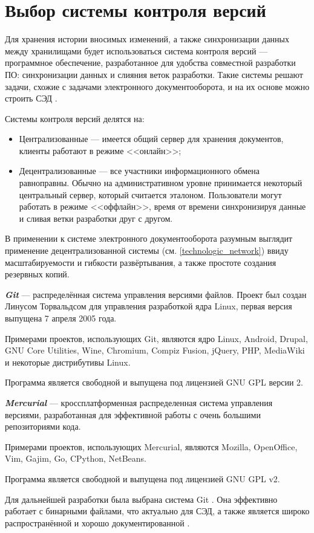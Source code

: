 \section{Выбор системы контроля версий} \label{technologic_cvs}

Для хранения истории вносимых изменений, а также синхронизации данных между хранилищами будет использоваться система контроля версий --- программное обеспечение, разработанное для удобства совместной разработки ПО: синхронизации данных и слияния веток разработки. Такие системы решают задачи, схожие с задачами  электронного документооборота, и на их основе можно строить СЭД \cite{my_conference_2013}.

\vspace{\baselineskip}
Системы контроля версий делятся на:
\begin{itemize}
		\item Централизованные --- имеется общий сервер для хранения документов, клиенты работают в режиме <<онлайн>>;
		\item Децентрализованные --- все участники информационного обмена равноправны. Обычно на административном уровне принимается некоторый центральный сервер, который считается эталоном. Пользователи могут работать в режиме <<оффлайн>>, время от времени синхронизируя данные и сливая ветки разработки друг с другом.
	\end{itemize}

\vspace{\baselineskip}
В применении к системе электронного документооборота разумным выглядит применение децентрализованной системы (см. \ref{technologic_network}) ввиду масштабируемости и гибкости развёртывания, а также простоте создания резервных копий. 

\vspace{\baselineskip}
\textbf{\textit{Git}} --- распределённая система управления версиями файлов. Проект был создан Линусом Торвальдсом для управления разработкой ядра Linux, первая версия выпущена 7 апреля 2005 года.

Примерами проектов, использующих Git, являются ядро Linux, Android, Drupal, GNU Core Utilities, Wine, Chromium, Compiz Fusion, jQuery, PHP, MediaWiki и некоторые дистрибутивы Linux.

Программа является свободной и выпущена под лицензией GNU GPL версии 2.

\vspace{\baselineskip}
\textbf{\textit{Mercurial}} --- кроссплатформенная распределенная система управления версиями, разработанная для эффективной работы с очень большими репозиториями кода. 

Примерами проектов, использующих Mercurial, являются Mozilla, OpenOffice, Vim, Gajim, Go, CPython, NetBeans.

Программа является свободной и выпущена под лицензией GNU GPL v2.

\vspace{\baselineskip}
Для дальнейшей разработки была выбрана система Git . Она эффективно работает с бинарными файлами, что актуально для СЭД, а также является широко распространённой и хорошо документированной \cite{my_conference_2013}.
